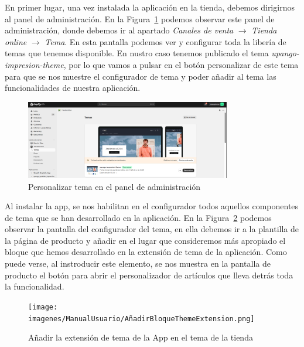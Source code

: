 \documentclass[12pt]{article}
\begin{document}
En primer lugar, una vez instalada la aplicación en la tienda, debemos dirigirnos al panel de administración. En la Figura~\ref{fig:PersonalizarTema} podemos observar este panel de administración, donde
debemos ir al apartado \textit{Canales de venta} $\rightarrow$  \textit{Tienda online} $\rightarrow$  \textit{Tema}. En esta pantalla podemos ver y configurar toda la libería de temas que tenemos disponible.
En nustro caso tenemos publicado el tema \textit{upango-impresion-theme}, por lo que vamos a pulsar en el botón personalizar de este tema para que se nos muestre el configurador de tema y poder
añadir al tema las funcionalidades de nuestra aplicación.

\begin{figure}[ht]
    \centering
    \includegraphics[width=0.8\textwidth]{imagenes/ManualUsuario/PantallaDePersonalizarTema.png}
    \caption{\label{fig:PersonalizarTema}Personalizar tema en el panel de administración}
    \vspace{\fill}
\end{figure}

Al instalar la app, se nos habilitan en el configurador todos aquellos componentes de tema que se han desarrollado en la aplicación.
En la Figura~\ref{fig:ThemeAppExtension} podemos observar la pantalla del configurador del tema, en ella debemos ir a la plantilla de la página de producto y añadir
en el lugar que consideremos más apropiado el bloque que hemos desarrollado en la extensión de tema de la aplicación. Como puede verse, al instroducir este elemento, se nos muestra en la pantalla de producto
el botón para abrir el personalizador de artículos que lleva detrás toda la funcionalidad.

\begin{figure}[ht]
    \centering
    \texttt{[image: imagenes/ManualUsuario/AñadirBloqueThemeExtension.png]}
    \caption{\label{fig:ThemeAppExtension}Añadir la extensión de tema de la App en el tema de la tienda}
    \vspace{\fill}
\end{figure}
\end{document}
